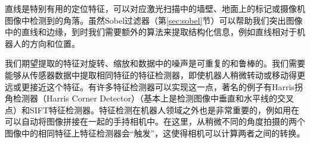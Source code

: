 
直线是特别有用的定位特征，可以对应激光扫描中的墙壁、地面上的标记或摄像机图像中检测到的角落。虽然Sobel过滤器（第\ref{sec:sobel}节）可以帮助我们突出图像中的直线和边缘，到时我们需要额外的算法来提取结构化信息，例如直线相对于机器人的方向和位置。


我们期望提取的特征对旋转、缩放和数据中的噪声是可重复的和鲁棒的。我们需要能够从传感器数据中提取相同特征的特征检测器，即使机器人稍微转动或移动得更远或更接近这个特征。有许多特征检测器可以实现这一点，著名的例子有Harris拐角检测器（Harris Corner Detector）（基本上是检测图像中垂直和水平线的交叉点）和SIFT特征检测器。特征检测在机器人领域之外也是非常重要的，例如用在可以自动将图像拼接在一起的手持相机中。在这里，从稍微不同的角度拍摄的两个图像中的相同特征上特征检测器会“触发”，这使得相机可以计算两者之间的转换。


